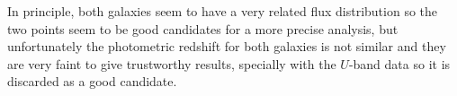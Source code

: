 In principle, both galaxies seem to have a very related flux distribution so the two points seem to be good candidates for a more precise analysis, but unfortunately the photometric redshift for both galaxies is not similar and they are very faint to give trustworthy results, specially with the $U$-band data so it is discarded as a good candidate.
